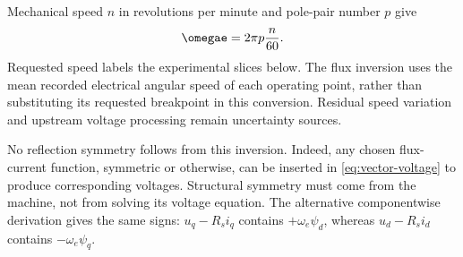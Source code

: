 Mechanical speed $n$ in revolutions per minute and pole-pair number $p$ give
\begin{equation}
 \omegae=2\pi p\frac{n}{60}.\label{eq:rpm-conversion}
\end{equation}
Requested speed labels the experimental slices below. The flux inversion
uses the mean recorded electrical angular speed of each operating point,
rather than substituting its requested breakpoint in this conversion.
Residual speed variation and upstream voltage processing remain uncertainty
sources.

No reflection symmetry follows from this inversion. Indeed, any chosen
flux-current function, symmetric or otherwise, can be inserted in
\cref{eq:vector-voltage} to produce corresponding voltages. Structural
symmetry must come from the machine, not from solving its voltage equation.
The alternative componentwise derivation gives the same signs: $u_q-R_si_q$
contains $+\omega_e\psi_d$, whereas $u_d-R_si_d$ contains
$-\omega_e\psi_q$.
